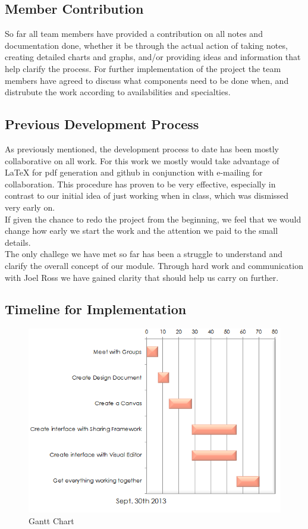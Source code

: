 \documentclass[12pt]{article}
\begin{document}
\subsection{Member Contribution}
So far all team members have provided a contribution on all notes and documentation done, whether it be through the actual action of taking notes, creating detailed charts and graphs, and/or providing ideas and information that help clarify the process. For further implementation of the project the team members have agreed to discuss what components need to be done when, and distrubute the work according to availabilities and specialties.

\subsection{Previous Development Process}
As previously mentioned, the development process to date has been mostly collaborative on all work. For this work we mostly would take advantage of LaTeX for pdf generation and github in conjunction with e-mailing for collaboration. This procedure has proven to be very effective, especially in contrast to our initial idea of just working when in class, which was dismissed very early on. \\
If given the chance to redo the project from the beginning, we feel that we would change how early we start the work and the attention we paid to the small details. \\
The only challege we have met so far has been a struggle to understand and clarify the overall concept of our module. Through hard work and communication with Joel Ross we have gained clarity that should help us carry on further. \\

\subsection{Timeline for Implementation}
\begin{figure}
\includegraphics{GanttChart.png}
\caption{Gantt Chart}
\end{figure}



%
\end{document}
